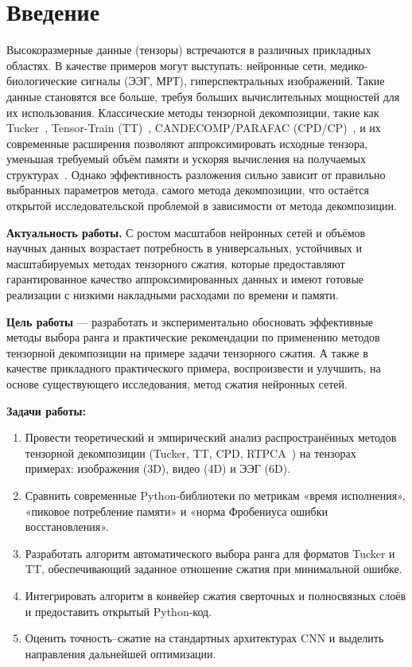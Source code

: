 \chapter{Введение}
\label{chap:intro}


Высокоразмерные данные (тензоры) встречаются в различных прикладных областях. В качестве примеров могут выступать: нейронные сети, медико-биологические сигналы (ЭЭГ, МРТ), гиперспектральных изображений. Такие данные становятся все больше, требуя больших вычислительных мощностей для их использования. Классические методы тензорной декомпозиции, такие как Tucker~\cite{tensorly_parafac_tucker}, Tensor-Train (TT)~\cite{tensorly_tensor_train}, CANDECOMP/PARAFAC (CPD/CP)~\cite{tensorly_parafac_tucker, tensorly_parafac_2, tensorly_parafac_3, tensor_decompositions_for_data_science, tensor_computation_for_data_analysis}, и их современные расширения позволяют аппроксимировать исходные тензора, уменьшая требуемый объём памяти и ускоряя вычисления на получаемых структурах~\cite{tensor_decompositions_for_data_science, tensor_computation_for_data_analysis}. Однако эффективность разложения сильно зависит от правильно выбранных параметров метода, самого метода декомпозиции, что остаётся открытой исследовательской проблемой в зависимости от метода декомпозиции.

\textbf{Актуальность работы.} С ростом масштабов нейронных сетей и объёмов научных данных возрастает потребность в универсальных, устойчивых и масштабируемых методах тензорного сжатия, которые предоставляют гарантированное качество аппроксимированных данных и имеют готовые реализации с низкими накладными расходами по времени и памяти.

\textbf{Цель работы} — разработать и экспериментально обосновать эффективные методы выбора ранга и практические рекомендации по применению методов тензорной декомпозиции на примере задачи тензорного сжатия. А также в качестве прикладного практического примера, воспроизвести и улучшить, на основе существующего исследования, метод сжатия нейронных сетей.

\textbf{Задачи работы:}
\begin{enumerate}
  \item Провести теоретический и эмпирический анализ распространённых методов тензорной декомпозиции (Tucker, TT, CPD, RTPCA~\cite{rtpca_method}) на тензорах примерах: изображения (3D), видео (4D) и ЭЭГ (6D).  
  \item Сравнить современные Python-библиотеки по метрикам «время исполнения», «пиковое потребление памяти» и «норма Фробениуса ошибки восстановления».  
  \item Разработать алгоритм автоматического выбора ранга для форматов Tucker и TT, обеспечивающий заданное отношение сжатия при минимальной ошибке.  
  \item Интегрировать алгоритм в конвейер сжатия сверточных и полносвязных слоёв и предоставить открытый Python-код.  
  \item Оценить точность–сжатие на стандартных архитектурах CNN и выделить направления дальнейшей оптимизации.
\end{enumerate}

